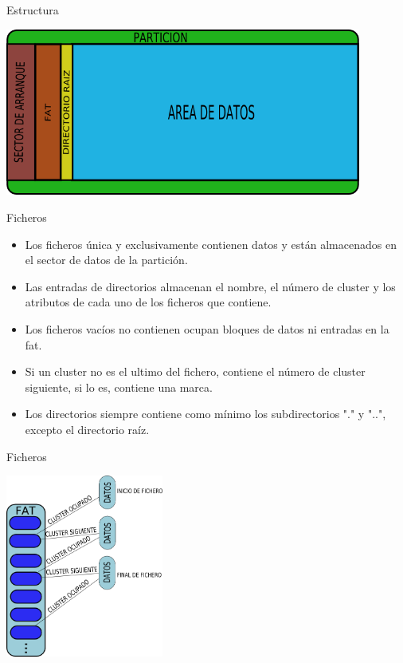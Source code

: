 \begin{frame}{Estructura}
  \begin{center}
    \includegraphics[height=5.5cm]{imgs/fat_struct.png}
  \end{center}
\end{frame}

\begin{frame}{Ficheros}
  \begin{itemize}
    \item Los ficheros única y exclusivamente contienen datos y están almacenados en el sector de datos de la partición.
    \item Las entradas de directorios almacenan el nombre, el número de cluster y los atributos de cada uno de los ficheros que contiene.
    \item Los ficheros vacíos no contienen ocupan bloques de datos ni entradas en la fat.
    \item Si un cluster no es el ultimo del fichero, contiene el número de cluster siguiente, si lo es, contiene una marca.
    \item Los directorios siempre contiene como mínimo los subdirectorios "." y "..", excepto el directorio raíz.
  \end{itemize}
\end{frame}

\begin{frame}{Ficheros}
  \begin{center}
    \includegraphics[height=6cm]{imgs/fat_files.png}
  \end{center}
\end{frame}
